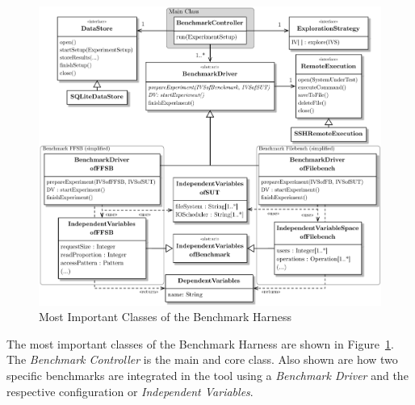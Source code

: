 \begin{figure}[htbp]
    \centering
    \includegraphics[scale=0.55]{graphics/Architecture.pdf}
    \caption{Most Important Classes of the Benchmark Harness}
    \label{fig:StaticDesign}
\end{figure}

The most important classes of the Benchmark Harness are shown in Figure~\ref{fig:StaticDesign}. The \textit{Benchmark Controller} is the main and core class. Also shown are how two specific benchmarks are integrated in the tool using a \textit{Benchmark Driver} and the respective configuration or \textit{Independent Variables}.


